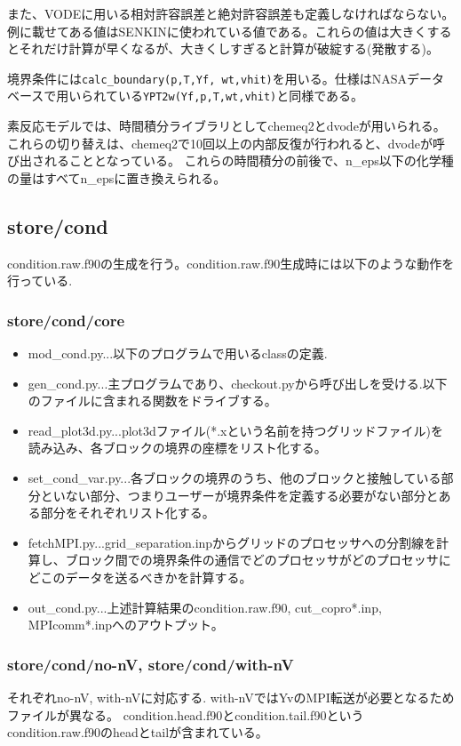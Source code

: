 \documentclass{jsarticle}
\begin{document}
また、VODEに用いる相対許容誤差と絶対許容誤差も定義しなければならない。例に載せてある値はSENKINに使われている値である。これらの値は大きくするとそれだけ計算が早くなるが、大きくしすぎると計算が破綻する(発散する)。

境界条件には\verb|calc_boundary(p,T,Yf, wt,vhit)|を用いる。仕様はNASAデータベースで用いられている\verb|YPT2w(Yf,p,T,wt,vhit)|と同様である。

素反応モデルでは、時間積分ライブラリとしてchemeq2とdvodeが用いられる。
これらの切り替えは、chemeq2で10回以上の内部反復が行われると、dvodeが呼び出されることとなっている。
これらの時間積分の前後で、n\_eps以下の化学種の量はすべてn\_epsに置き換えられる。
\subsection{store/cond}%
condition.raw.f90の生成を行う。condition.raw.f90生成時には以下のような動作を行っている.
\subsubsection{store/cond/core}
\begin{itemize}
\item mod\_cond.py...以下のプログラムで用いるclassの定義.
\item gen\_cond.py...主プログラムであり、checkout.pyから呼び出しを受ける.以下のファイルに含まれる関数をドライブする。
\item read\_plot3d.py...plot3dファイル(*.xという名前を持つグリッドファイル)を読み込み、各ブロックの境界の座標をリスト化する。
\item set\_cond\_var.py...各ブロックの境界のうち、他のブロックと接触している部分といない部分、つまりユーザーが境界条件を定義する必要がない部分とある部分をそれぞれリスト化する。
\item fetchMPI.py...grid\_separation.inpからグリッドのプロセッサへの分割線を計算し、ブロック間での境界条件の通信でどのプロセッサがどのプロセッサにどこのデータを送るべきかを計算する。
\item out\_cond.py...上述計算結果のcondition.raw.f90, cut\_copro*.inp, MPIcomm*.inpへのアウトプット。
\end{itemize}

\subsubsection{store/cond/no-nV, store/cond/with-nV}
それぞれno-nV, with-nVに対応する. with-nVではYvのMPI転送が必要となるためファイルが異なる。
condition.head.f90とcondition.tail.f90というcondition.raw.f90のheadとtailが含まれている。
\newpage
\end{document}

